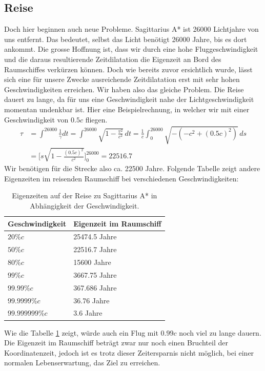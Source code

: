 \begin{refsection}
    \subsection{Reise}
    Doch hier beginnen auch neue Probleme. Sagittarius A* ist 26000 Lichtjahre von uns entfernt. Das bedeutet, selbst das Licht benötigt 26000 Jahre, bis es dort ankommt. Die grosse Hoffnung ist, dass wir durch eine hohe Fluggeschwindigkeit und die daraus resultierende Zeitdilatation die Eigenzeit an Bord des Raumschiffes verkürzen können. 
    Doch wie bereits zuvor ersichtlich wurde, lässt sich eine für unsere Zwecke ausreichende Zeitdilatation erst mit sehr hohen Geschwindigkeiten erreichen. Wir haben also das gleiche Problem. Die Reise dauert zu lange, da für uns eine Geschwindigkeit nahe der Lichtgeschwindigkeit momentan undenkbar ist.
    Hier eine Beispielrechnung, in welcher wir mit einer Geschwindigkeit von $0.5c$ fliegen.
	\begin{align*}
	\tau
	&= 
	\int_{}^{26000}\frac{1}{\gamma}dt=\int_{}^{26000}\sqrt{1-\frac{v^2}{c^2}}\,dt
	= 
	\frac{1}{c}\int_{0}^{26000}\sqrt{-(-c^2+(0.5c)^2)}\,ds\\
	&=
	\biggl[s\sqrt{1-\frac{(0.5c)^{2}}{c^2}}\biggr]_0^{26000}
	=
	22516.7
	\end{align*}
	Wir benötigen für die Strecke also ca. 22500 Jahre.
	Folgende Tabelle zeigt andere Eigenzeiten im reisenden Raumschiff bei verschiedenen Geschwindigkeiten:
    \begin{table}[H]
         \begin{center}
            \begin{tabular}{ | l | l |}
            \hline
            Geschwindigkeit & Eigenzeit im Raumschiff \\ \hline
            $20\%c$ & 25474.5 Jahre \\ 
            $50\%c$ & 22516.7 Jahre \\
            $80\%c$ & 15600 Jahre \\ 
            $99\%c$ & 3667.75 Jahre \\ 
            $99.99\%c$ & 367.686 Jahre \\ 
            $99.9999\%c$ & 36.76 Jahre \\ 
            $99.999999\%c$ & 3.6 Jahre \\ \hline
             \end{tabular}
        \end{center}
    \caption{Eigenzeiten auf der Reise zu Sagittarius A* in Abhängigkeit der Geschwindigkeit.}
    \label{table:eigenzeiten}
    \end{table}
    \noindent
	Wie die Tabelle \ref{table:eigenzeiten} zeigt, würde auch ein Flug mit $0.99c$ noch viel zu lange dauern. 
	Die Eigenzeit im Raumschiff beträgt zwar nur noch einen Bruchteil der Koordinatenzeit, jedoch ist es trotz dieser Zeitersparnis nicht möglich, bei einer normalen Lebenserwartung, das Ziel zu erreichen.
    

\end{refsection}
